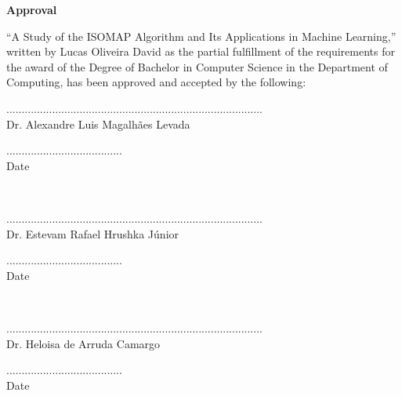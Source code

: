 \begin{center}
	\textbf{Approval}
\end{center}

“A Study of the ISOMAP Algorithm and Its Applications in Machine Learning,” written by Lucas Oliveira David as the partial fulfillment of the requirements for the award of the Degree of Bachelor  in Computer Science in the Department of Computing, has been approved and accepted by the following:

\vfill

\begin{minipage}{.7\linewidth}
	....................................................................................\\
	Dr. Alexandre Luis Magalhães Levada
\end{minipage}%
\begin{minipage}{.3\linewidth}
	\begin{flushright}
		......................................\\
		Date
	\end{flushright}
\end{minipage}\\[1.5cm]

\begin{minipage}{.7\linewidth}
	....................................................................................\\
	Dr. Estevam Rafael Hrushka Júnior
\end{minipage}%
\begin{minipage}{.3\linewidth}
	\begin{flushright}
		......................................\\
		Date
	\end{flushright}
\end{minipage}\\[1.5cm]

\begin{minipage}{.7\linewidth}
	....................................................................................\\
	Dr. Heloisa de Arruda Camargo
\end{minipage}%
\begin{minipage}{.3\linewidth}
	\begin{flushright}
		......................................\\
		Date
	\end{flushright}
\end{minipage}\\[1.5cm]

